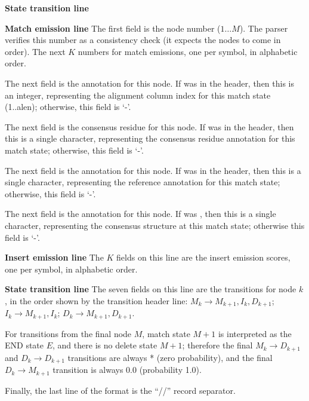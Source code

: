 \begin{sreitems}{\textbf{State transition line}}

\item [\textbf{Match emission line}] The first field is the node
number ($1 \ldots M$).  The parser verifies this number as a
consistency check (it expects the nodes to come in order). The next
$K$ numbers for match emissions, one per symbol, in alphabetic order.

The next field is the  annotation for this node.  If
 was  in the header, then this is an integer,
representing the alignment column index for this match state
(1..alen); otherwise, this field is `-'.

The next field is the  consensus residue for this node.  If
 was  in the header, then this is a single
character, representing the consensus residue annotation for this
match state; otherwise, this field is `-'.

The next field is the  annotation for this node.  If
 was  in the header, then this is a single
character, representing the reference annotation for this match state;
otherwise, this field is `-'.

The next field is the  annotation for this node.  If
 was , then this is a single character,
representing the consensus structure at this match state; otherwise
this field is `-'.

\item [\textbf{Insert emission line}] The $K$ fields on this line are
the insert emission scores, one per symbol, in alphabetic order.

\item [\textbf{State transition line}] The seven fields on this line
are the transitions for node $k$, in the order shown by the transition
header line: $M_k \rightarrow M_{k+1}, I_{k}, D_{k+1}$; $ I_k
\rightarrow M_{k+1}, I_k$; $D_{k} \rightarrow M_{k+1}, D_{k+1}$.

For transitions from the final node $M$, match state $M+1$ is
interpreted as the END state $E$, and there is no delete state $M+1$;
therefore the final $M_k \rightarrow D_{k+1}$ and $D_k \rightarrow
D_{k+1}$ transitions are always * (zero probability), and the final
$D_k \rightarrow M_{k+1}$ transition is always 0.0 (probability 1.0).
\end{sreitems}

Finally, the last line of the format is the ``//'' record separator.

